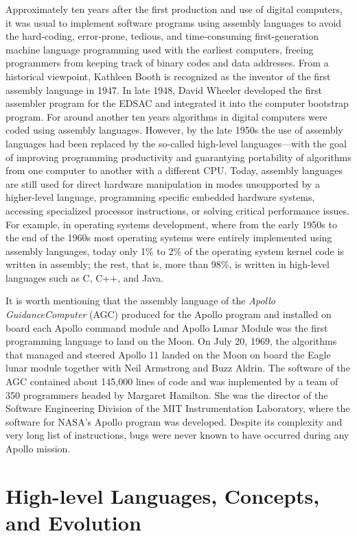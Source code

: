 Approximately ten years after the first production and use of digital \hbox{computers,} it was usual to implement software programs using assembly languages to avoid the hard-coding, error-prone, tedious, and time-consuming first-generation machine language programming used with the earliest computers, freeing programmers from keeping track of binary codes and data addresses. From a historical viewpoint, Kathleen Booth is recognized as the inventor of the first assembly language in 1947. In late 1948, David Wheeler developed the first assembler program for the EDSAC and integrated it into the computer bootstrap program. For around another ten years algorithms in digital computers were coded using assembly languages. However, by the late 1950s the use of assembly languages had been replaced by the so-called high-level languages---with the goal of improving programming productivity and guarantying portability of algorithms from one computer to another with a different CPU. Today, assembly languages are still used for direct hardware manipulation in modes unsupported by a higher-level language, programming specific embedded hardware systems, accessing specialized processor instructions, or solving critical performance issues. For example, in operating systems development, where from the early 1950s to the end of the 1960s most operating systems were entirely implemented using assembly languages, today only 1\% to 2\% of the operating system kernel code is written in assembly; the rest, that is, more than 98\%, is written in high-level languages such as C, C++, and Java.




It is worth mentioning that the assembly language of the \textit{Apollo Guidance\break Computer} (AGC) produced for the Apollo program and installed on board each Apollo command module and Apollo Lunar Module was the first programming language to land on the Moon. On July 20, 1969, the algorithms that managed and steered Apollo 11 landed on the Moon on board the Eagle lunar module together with Neil Armstrong and Buzz Aldrin. The software of the AGC contained about 145,000 lines of code and was implemented by a team of 350 programmers headed by Margaret Hamilton. She was the director of the Software Engineering Division of the MIT Instrumentation Laboratory, where the software for NASA's Apollo program was developed. Despite its complexity and very long list of instructions, bugs were never known to have occurred during any Apollo mission.

\section{\label{sec:2.5}High-level Languages, Concepts, and Evolution}

